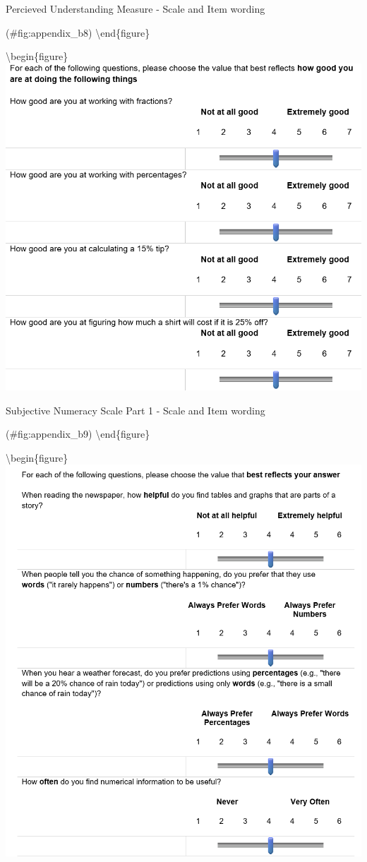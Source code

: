 \documentclass[
  english,
  man]{apa6}
\begin{document}
\caption{Percieved Understanding Measure - Scale and Item wording}

(\#fig:appendix\_b8)
\textbackslash end\{figure\}

\textbackslash begin\{figure\}
\includegraphics[width=1\linewidth]{appendix_b_9}

\caption{Subjective Numeracy Scale Part 1 - Scale and Item wording}

(\#fig:appendix\_b9)
\textbackslash end\{figure\}

\textbackslash begin\{figure\}
\includegraphics[width=1\linewidth]{appendix_b_10}
\end{document}
